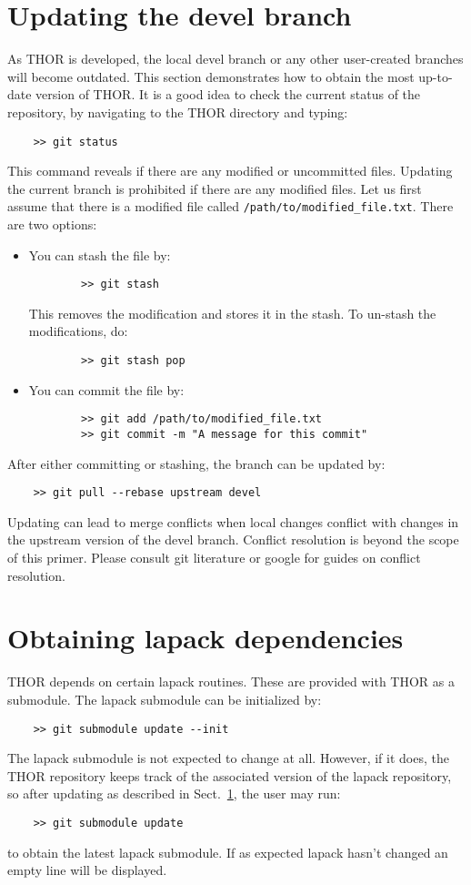 \section{Updating the devel branch}\label{sec:updating_branch}
As THOR is developed, the local devel branch or any other user-created branches will become outdated. This section demonstrates how to obtain the most up-to-date version of THOR.
It is a good idea to check the current status of the repository, by navigating to the THOR directory and typing:
\begin{verbatim}
    >> git status
\end{verbatim}
This command reveals if there are any modified or uncommitted files. Updating the current branch is prohibited if there are any modified files. Let us first assume that there is a modified file called \verb"/path/to/modified_file.txt". There are two options: 
\begin{itemize}
    \item You can stash the file by:
    \begin{verbatim}
        >> git stash
    \end{verbatim}
    This removes the modification and stores it in the stash. To un-stash the modifications, do:
    \begin{verbatim}
        >> git stash pop
    \end{verbatim}
    \item You can commit the file by:
    \begin{verbatim}
        >> git add /path/to/modified_file.txt
        >> git commit -m "A message for this commit"
    \end{verbatim}
\end{itemize}
After either committing or stashing, the branch can be updated by:
\begin{verbatim}
    >> git pull --rebase upstream devel
\end{verbatim}
Updating can lead to merge conflicts when local changes conflict with changes in the upstream version of the devel branch. Conflict resolution is beyond the scope of this primer. Please consult git literature or google for guides on conflict resolution.

\section{Obtaining lapack dependencies}
THOR depends on certain lapack routines. These are provided with THOR as a submodule. The lapack submodule can be initialized by:
\begin{verbatim}
    >> git submodule update --init
\end{verbatim}
The lapack submodule is not expected to change at all. However, if it does, the THOR repository keeps track of the associated version of the lapack repository, so after updating as described in Sect.~\ref{sec:updating_branch}, the user may run:
\begin{verbatim}
    >> git submodule update 
\end{verbatim}
to obtain the latest lapack submodule. If as expected lapack hasn't changed an empty line will be displayed.

